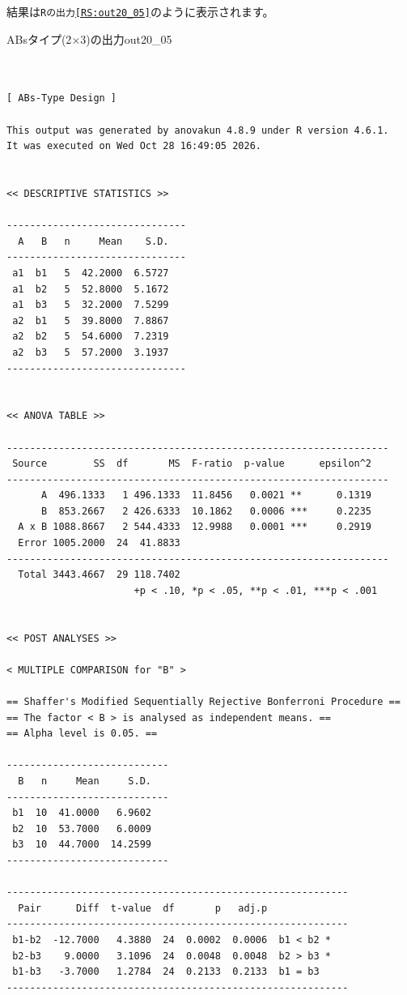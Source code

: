 \documentclass{ltjbook}
\begin{document}
結果は\texttt{Rの出力\ref{RS:out20_05}}のように表示されます。
\begin{Rscreen}{ABsタイプ(2$\times$3)の出力}{out20_05}
	\begin{verbatim}


[ ABs-Type Design ]

This output was generated by anovakun 4.8.9 under R version 4.6.1.
It was executed on Wed Oct 28 16:49:05 2026.

 
<< DESCRIPTIVE STATISTICS >>

-------------------------------
  A   B   n     Mean    S.D. 
-------------------------------
 a1  b1   5  42.2000  6.5727 
 a1  b2   5  52.8000  5.1672 
 a1  b3   5  32.2000  7.5299 
 a2  b1   5  39.8000  7.8867 
 a2  b2   5  54.6000  7.2319 
 a2  b3   5  57.2000  3.1937 
-------------------------------


<< ANOVA TABLE >>

------------------------------------------------------------------
 Source        SS  df       MS  F-ratio  p-value      epsilon^2 
------------------------------------------------------------------
      A  496.1333   1 496.1333  11.8456   0.0021 **      0.1319 
      B  853.2667   2 426.6333  10.1862   0.0006 ***     0.2235 
  A x B 1088.8667   2 544.4333  12.9988   0.0001 ***     0.2919 
  Error 1005.2000  24  41.8833                                  
------------------------------------------------------------------
  Total 3443.4667  29 118.7402                                  
                      +p < .10, *p < .05, **p < .01, ***p < .001


<< POST ANALYSES >>

< MULTIPLE COMPARISON for "B" >

== Shaffer's Modified Sequentially Rejective Bonferroni Procedure ==
== The factor < B > is analysed as independent means. == 
== Alpha level is 0.05. == 
 
----------------------------
  B   n     Mean     S.D. 
----------------------------
 b1  10  41.0000   6.9602 
 b2  10  53.7000   6.0009 
 b3  10  44.7000  14.2599 
----------------------------

-----------------------------------------------------------
  Pair      Diff  t-value  df       p   adj.p            
-----------------------------------------------------------
 b1-b2  -12.7000   4.3880  24  0.0002  0.0006  b1 < b2 * 
 b2-b3    9.0000   3.1096  24  0.0048  0.0048  b2 > b3 * 
 b1-b3   -3.7000   1.2784  24  0.2133  0.2133  b1 = b3   
-----------------------------------------------------------



\end{verbatim}
\end{Rscreen}
\end{document}
